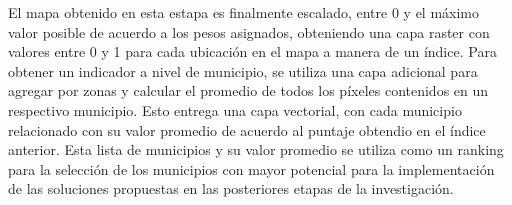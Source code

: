 El mapa obtenido en esta estapa es finalmente escalado, entre 0 y el máximo valor posible de acuerdo a los pesos asignados, obteniendo una capa raster con 
valores entre 0 y 1 para cada ubicación en el mapa a manera de un índice.  Para obtener un indicador a nivel de municipio, se utiliza una capa adicional para 
agregar por zonas y calcular el promedio de todos los píxeles contenidos en un respectivo municipio.  Esto entrega una capa vectorial, con cada municipio 
relacionado con su valor promedio de acuerdo al puntaje obtendio en el índice anterior.  Esta lista de municipios y su valor promedio se utiliza como un 
ranking para la selección de los municipios con mayor potencial para la implementación de las soluciones propuestas en las posteriores etapas de la 
investigación.
